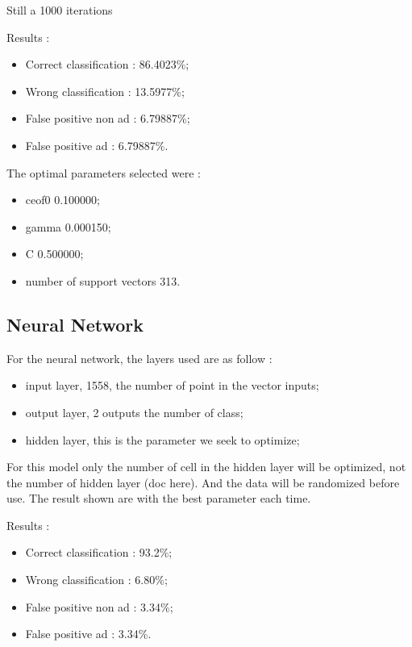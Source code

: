 Still a 1000 iterations

Results :
\begin{itemize}
  \item Correct classification : 86.4023\%;
  \item Wrong classification : 13.5977\%;
  \item False positive non ad : 6.79887\%;
  \item False positive ad : 6.79887\%.
\end{itemize}

The optimal parameters selected were :
\begin{itemize}
  \item ceof0 0.100000;
  \item gamma 0.000150;
  \item C 0.500000;
  \item number of support vectors 313.
\end{itemize}


\subsection{Neural Network}

For the neural network, the layers used are as follow :
  \begin{itemize}
    \item input layer, 1558, the number of point in the vector inputs;
    \item output layer, 2 outputs the number of class;
    \item hidden layer, this is the parameter we seek to optimize;
  \end{itemize}

 For this model only the number of cell in the hidden layer will be optimized, not the number of hidden layer (doc here). And the data will be randomized before use. The result shown are with the best parameter each time.

  Results :
  \begin{itemize}
    \item Correct classification : 93.2\%;
    \item Wrong classification : 6.80\%;
    \item False positive non ad : 3.34\%;
    \item False positive ad : 3.34\%.
  \end{itemize}


